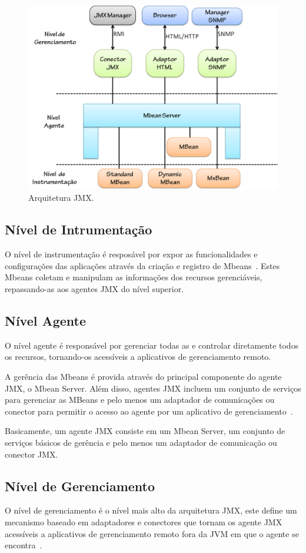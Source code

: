 \begin{figure}[htp]
\centering
\includegraphics[width=12cm]{chapters/chapter4/arch_jmx.png}
\caption[Arquitetura JMX]{Arquitetura JMX.}
\label{fig:arch_jmx}
\end{figure}

\subsection{Nível de Intrumentação}
O nível de instrumentação é resposável por expor as funcionalidades e configurações das aplicações através da criação e registro de Mbeans~\cite{jmx}. Estes Mbeans coletam e manipulam as informações dos recursos gerenciáveis, repassando-as aos agentes JMX do nível superior.

\subsection{Nível Agente}
O nível agente é responsável por gerenciar todas as e controlar diretamente todos os recursos, tornando-os acessíveis a aplicativos de gerenciamento remoto.

A gerência das Mbeans é provida através do principal componente do agente JMX, o Mbean Server. Além disso, agentes JMX incluem um conjunto de serviços para gerenciar as MBeans e pelo menos um adaptador de comunicações ou conector para permitir o acesso ao agente por um aplicativo de gerenciamento~\cite{jmx}.

Basicamente, um agente JMX consiste em um Mbean Server, um conjunto de serviços básicos de gerência e pelo menos um adaptador de comunicação ou conector JMX.

\subsection{Nível de Gerenciamento}
O nível de gerenciamento é o nível mais alto da arquitetura JMX, este define um mecanismo baseado em adaptadores e conectores que tornam os agente JMX acessíveis a aplicativos de gerenciamento remoto fora da JVM em que o agente se encontra~\cite{jmx}.

